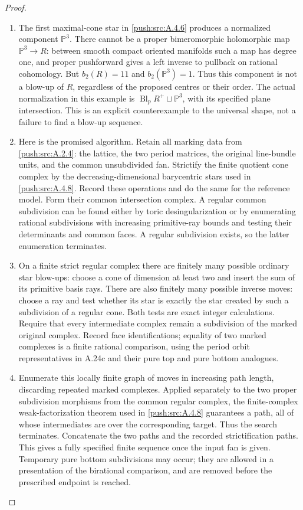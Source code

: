 \begin{proof}
\begin{enumerate}[label=\arabic*.,leftmargin=*]
\item The first maximal-cone star in \ref{push:src:A.4.6} produces a normalized
component $\mathbb P^3$. There cannot be a proper
bimeromorphic holomorphic map $\mathbb P^3\to R$:
between smooth compact oriented manifolds such a map
has degree one, and proper pushforward gives a left
inverse to pullback on rational cohomology. But
$b_2(R)=11$ and $b_2(\mathbb P^3)=1$.
Thus this component is not a blow-up of $R$, regardless
of the proposed centres or their order. The actual
normalization in this example is
$\operatorname{Bl}_pR^+\sqcup\mathbb P^3$,
with its specified plane intersection. This is an
explicit counterexample to the universal shape, not
a failure to find a blow-up sequence.

\item Here is the promised algorithm. Retain all marking
data from \ref{push:src:A.2.4}: the lattice, the two period matrices,
the original line-bundle units, and the common
unsubdivided fan. Strictify the finite quotient cone
complex by the decreasing-dimensional barycentric
stars used in \ref{push:src:A.4.8}. Record these operations and do
the same for the reference model. Form their common
intersection complex. A regular common subdivision
can be found either by toric desingularization or by
enumerating rational subdivisions with increasing
primitive-ray bounds and testing their determinants
and common faces. A regular subdivision exists, so
the latter enumeration terminates.

\item On a finite strict regular complex there are finitely
many possible ordinary star blow-ups: choose a cone
of dimension at least two and insert the sum of its
primitive basis rays. There are also finitely many
possible inverse moves: choose a ray and test whether
its star is exactly the star created by such a
subdivision of a regular cone. Both tests are exact
integer calculations. Require that every intermediate
complex remain a subdivision of the marked original
complex. Record face identifications; equality of two
marked complexes is a finite rational comparison,
using the period orbit representatives in A.24c and
their pure top and pure bottom analogues.

\item Enumerate this locally finite graph of moves in
increasing path length, discarding repeated marked
complexes. Applied separately to the two proper
subdivision morphisms from the common regular
complex, the finite-complex weak-factorization theorem
used in \ref{push:src:A.4.8} guarantees a path, all of whose
intermediates are over the corresponding target.
Thus the search terminates. Concatenate the two paths
and the recorded strictification paths. This gives a
fully specified finite sequence once the input fan is
given. Temporary pure bottom subdivisions may occur;
they are allowed in a presentation of the birational
comparison, and are removed before the prescribed
endpoint is reached.


\end{enumerate}
\end{proof}
